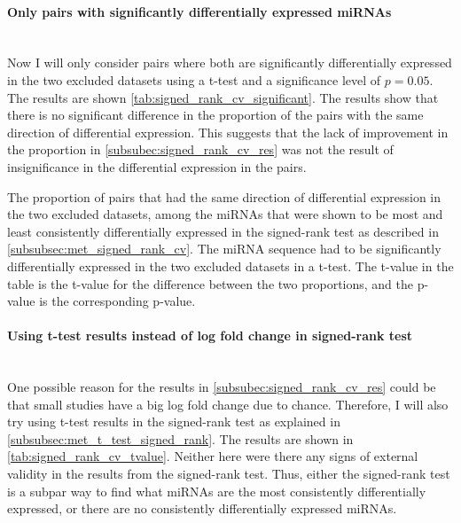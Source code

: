 {{{\paragraph{Only pairs with significantly differentially expressed miRNAs} \mbox{} \\
Now I will only consider pairs where both are significantly differentially expressed in the two excluded datasets using a t-test and a significance level of $p = 0.05$. The results are shown \autoref{tab:signed_rank_cv_significant}. The results show that there is no significant difference in the proportion of the pairs with the same direction of differential expression. This suggests that the lack of improvement in the proportion in \autoref{subsubec:signed_rank_cv_res} was not the result of insignificance in the differential expression in the pairs.

\begin{table}
    \caption{The proportion of pairs that had the same direction of differential expression in the two excluded datasets, among the miRNAs that were shown to be most and least consistently differentially expressed in the signed-rank test as described in \autoref{subsubsec:met_signed_rank_cv}. The miRNA sequence had to be significantly differentially expressed in the two excluded datasets in a t-test. The t-value in the table is the t-value for the difference between the two proportions, and the p-value is the corresponding p-value.}
    \label{tab:signed_rank_cv_significant}
    \begin{center}
    \end{center}
\end{table}

\paragraph{Using t-test results instead of log fold change in signed-rank test} \mbox{} \\
One possible reason for the results in \autoref{subsubec:signed_rank_cv_res} could be that small studies have a big log fold change due to chance. Therefore, I will also try using t-test results in the signed-rank test as explained in \autoref{subsubsec:met_t_test_signed_rank}. The results are shown in \autoref{tab:signed_rank_cv_tvalue}. Neither here were there any signs of external validity in the results from the signed-rank test. Thus, either the signed-rank test is a subpar way to find what miRNAs are the most consistently differentially expressed, or there are no consistently differentially expressed miRNAs.

}}}
